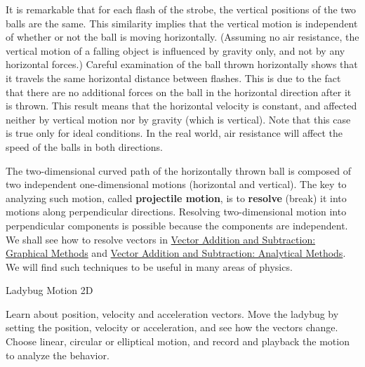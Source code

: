 \documentclass[
]{book}
\newenvironment{note}{}{}
\begin{document}
It is remarkable that for each flash of the strobe, the vertical
positions of the two balls are the same. This similarity implies that
the vertical motion is independent of whether or not the ball is moving
horizontally. (Assuming no air resistance, the vertical motion of a
falling object is influenced by gravity only, and not by any horizontal
forces.) Careful examination of the ball thrown horizontally shows that
it travels the same horizontal distance between flashes. This is due to
the fact that there are no additional forces on the ball in the
horizontal direction after it is thrown. This result means that the
horizontal velocity is constant, and affected neither by vertical motion
nor by gravity (which is vertical). Note that this case is true only for
ideal conditions. In the real world, air resistance will affect the
speed of the balls in both directions.

The two-dimensional curved path of the horizontally thrown ball is
composed of two independent one-dimensional motions (horizontal and
vertical). The key to analyzing such motion, called \textbf{projectile
motion}, is to \textbf{resolve} (break) it into motions along perpendicular
directions. Resolving two-dimensional motion into perpendicular
components is possible because the components are independent. We shall
see how to resolve vectors in \href{/m54781}{Vector Addition and Subtraction:
Graphical Methods} and \href{/m54783}{Vector Addition and Subtraction:
Analytical Methods}. We will find such techniques to be useful
in many areas of physics.

\hypertarget{eip-652}{}
\begin{note}

Ladybug Motion 2D

Learn about position, velocity and acceleration vectors. Move the
ladybug by setting the position, velocity or acceleration, and see how
the vectors change. Choose linear, circular or elliptical motion, and
record and playback the motion to analyze the behavior. {\hfill\break
}

\hypertarget{fs-id1167062339457}{}

\end{note}
\end{document}
